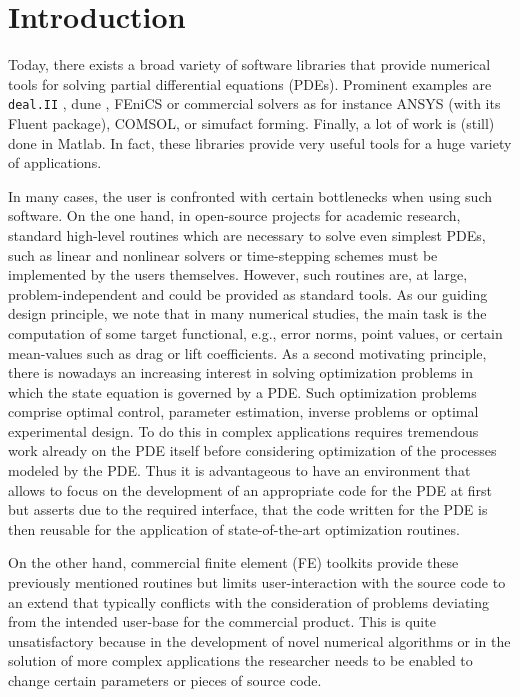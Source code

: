 \documentclass[smallextended]{svjour3}       %
\numberwithin{equation}{section}
\newcommand{\deal}{\texttt{deal.II}}
\begin{document}
\section{Introduction}
\label{introduction}
Today, there exists a broad variety of software libraries
that provide numerical tools for solving partial differential
equations (PDEs). Prominent examples are 
\deal{} \citep{dealnew}, dune \citep{dune}, 
FEniCS \citep{fenics}
or commercial solvers as for instance ANSYS (with its Fluent package),
COMSOL, or simufact forming.
Finally, a lot of work is (still) done in Matlab.
In fact, these libraries provide very useful tools 
for a huge variety of applications. 

In many cases, the user is confronted with 
certain bottlenecks when using such software. 
On the one hand, in open-source projects for academic research, 
standard high-level routines 
which are necessary to solve even simplest PDEs,
such as linear and nonlinear solvers or time-stepping schemes must 
be implemented by the users themselves. However, such routines are, at large,
problem-independent and could be provided as standard tools. 
As our guiding design principle, we note that in many 
numerical studies, the main task is the computation of some  
target functional, e.g., error norms,
point values, or certain mean-values such as drag or lift coefficients.
As a second motivating principle, 
there is nowadays an increasing interest in solving
optimization problems in which the state equation is governed 
by a PDE. Such optimization problems comprise optimal control,
parameter estimation, inverse problems or optimal experimental design. 
To do this in complex applications requires tremendous work already
on the PDE itself before considering optimization of the processes modeled 
by the PDE. Thus it is advantageous to have an environment that allows to 
focus on the development of an appropriate code for the PDE at first but 
asserts due to the required interface, that the code written for the PDE
is then reusable for the application of state-of-the-art optimization 
routines.

On the other hand, commercial finite element (FE) toolkits provide these 
previously mentioned routines but limits user-interaction
with the source code to an extend that typically conflicts
with the consideration of problems deviating from the intended 
user-base for the commercial product. 
This is quite unsatisfactory because in the development of 
novel numerical algorithms  or in the solution of more complex 
applications the researcher needs to be enabled 
to change certain parameters or pieces of source code. 
\end{document}
